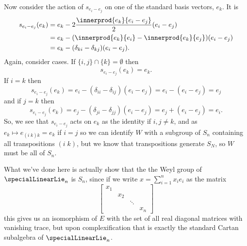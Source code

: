 \documentclass[fleqn]{NotesClass}
\begin{document}
\begin{exm}{}{}
        Now consider the action of \(s_{e_i - e_j}\) on one of the standard basis vectors, \(e_k\).
        It is
        \begin{align}
            s_{e_i - e_j}(e_k) &= e_k - 2\frac{\innerprod{e_k}{e_i - e_j}}{2} (e_i - e_j)\\
            &= e_k - (\innerprod{e_k}{e_i} - \innerprod{e_k}{e_j})(e_i - e_j)\\
            &= e_k - (\delta_{ki} - \delta_{kj})(e_i - e_j).
        \end{align}
        Again, consider cases.
        If \(\{i, j\} \cap \{k\} = \emptyset\) then
        \begin{equation}
            s_{e_i - e_j}(e_k) = e_k.
        \end{equation}
        If \(i = k\) then
        \begin{equation}
            s_{e_i - e_j}(e_k) = e_i - (\delta_{ii} - \delta_{ij})(e_i - e_j) = e_i - (e_i - e_j) = e_j
        \end{equation}
        and if \(j = k\) then
        \begin{equation}
            s_{e_i - e_j}(e_k) = e_j - (\delta_{ji} - \delta_{jj})(e_i - e_j) = e_j + (e_i - e_j) = e_i.
        \end{equation}
        So, we see that \(s_{e_i - e_j}\) acts on \(e_k\) as the identity if \(i, j \ne k\), and as \(e_k \mapsto e_{(i\; k)k} = e_k\) if \(i = j\) so we can identify \(W\) with a subgroup of \(S_n\) containing all transpositions \((i\; k)\), but we know that transpositions generate \(S_N\), so \(W\) must be all of \(S_n\).
        
        What we've done here is actually show that the the Weyl group of \(\specialLinearLie_n\) is \(S_n\), since if we write \(x = \sum_{i=1}^{n} x_i e_i\) as the matrix
        \begin{equation}
            \begin{bmatrix}
                x_1 \\
                & x_2\\
                && \ddots\\
                &&& x_n
            \end{bmatrix}
        \end{equation}
        this gives us an isomorphism of \(E\) with the set of all real diagonal matrices with vanishing trace, but upon complexification that is exactly the standard Cartan subalgebra of \(\specialLinearLie_n\).
    \end{exm}
    
\end{document}
